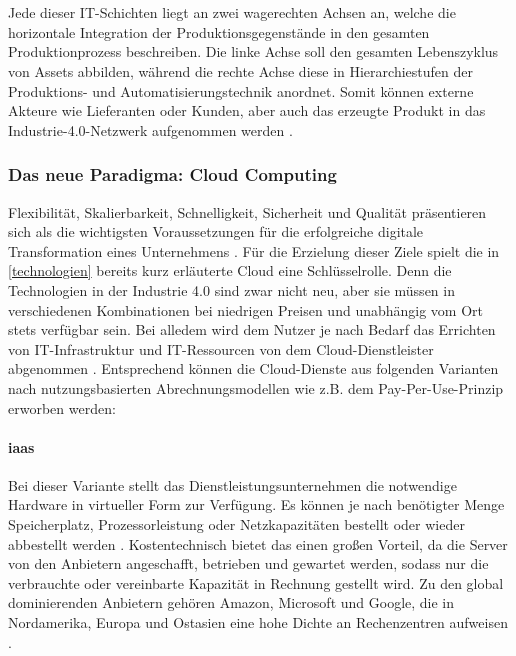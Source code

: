 \\\\
Jede dieser IT-Schichten liegt an zwei wagerechten Achsen an, welche die horizontale Integration der Produktionsgegenstände in den gesamten Produktionprozess beschreiben. Die linke Achse soll den gesamten Lebenszyklus von Assets abbilden, während die rechte Achse diese in Hierarchiestufen der Produktions- und Automatisierungstechnik anordnet. Somit können externe Akteure wie Lieferanten oder Kunden, aber auch das erzeugte Produkt in das Industrie-4.0-Netzwerk aufgenommen werden \citep{BITKOM2015}.


\subsubsection{Das neue Paradigma: Cloud Computing}

Flexibilität, Skalierbarkeit, Schnelligkeit, Sicherheit und Qualität präsentieren sich als die wichtigsten Voraussetzungen für die erfolgreiche digitale Transformation eines Unternehmens \citep{Acharya2019}. Für die Erzielung dieser Ziele spielt die in \ref{technologien} bereits kurz erläuterte Cloud eine Schlüsselrolle. Denn die Technologien in der Industrie 4.0 sind zwar nicht neu, aber sie müssen in verschiedenen Kombinationen bei niedrigen Preisen und unabhängig vom Ort stets verfügbar sein. Bei alledem wird dem Nutzer je nach Bedarf das Errichten von IT-Infrastruktur und IT-Ressourcen von dem Cloud-Dienstleister abgenommen \citep{Dzombeta2017}. Entsprechend können die Cloud-Dienste aus folgenden Varianten nach nutzungsbasierten Abrechnungsmodellen wie z.B. dem Pay-Per-Use-Prinzip erworben werden:

\paragraph{\ac{iaas}} Bei dieser Variante stellt das Dienstleistungsunternehmen die notwendige Hardware in virtueller Form zur Verfügung. Es können je nach benötigter Menge Speicherplatz, Prozessorleistung oder Netzkapazitäten bestellt oder wieder abbestellt werden \citep{Dzombeta2017}. Kostentechnisch bietet das einen großen Vorteil, da die Server von den Anbietern angeschafft, betrieben und gewartet werden, sodass nur die verbrauchte oder vereinbarte Kapazität in Rechnung gestellt wird. Zu den global dominierenden Anbietern gehören Amazon, Microsoft und Google, die in Nordamerika, Europa und Ostasien eine hohe Dichte an Rechenzentren aufweisen \citep{Acharya2019}.

